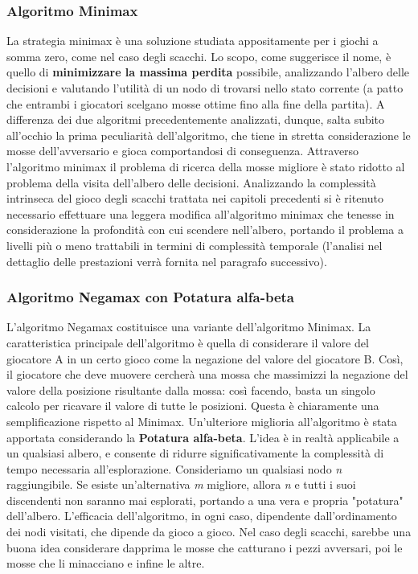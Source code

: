 \subsubsection{Algoritmo Minimax}
La strategia minimax è una soluzione studiata appositamente per i giochi a somma zero, come nel caso degli scacchi. Lo scopo, come suggerisce il nome, è quello di \textbf{minimizzare la massima perdita} possibile, analizzando l'albero delle decisioni e valutando l'utilità di un nodo di trovarsi nello stato corrente (a patto che entrambi i giocatori scelgano mosse ottime fino alla fine della partita). A differenza dei due algoritmi precedentemente analizzati, dunque, salta subito all'occhio la prima peculiarità dell'algoritmo, che tiene in stretta considerazione le mosse dell'avversario e gioca comportandosi di conseguenza. Attraverso l'algoritmo minimax il problema di ricerca della mosse migliore è stato ridotto al problema della visita dell'albero delle decisioni. Analizzando la complessità intrinseca del gioco degli scacchi trattata nei capitoli precedenti si è ritenuto necessario effettuare una leggera modifica all'algoritmo minimax che tenesse in considerazione la profondità con cui scendere nell'albero, portando il problema a livelli più o meno trattabili in termini di complessità temporale (l'analisi nel dettaglio delle prestazioni verrà fornita nel paragrafo successivo).
\subsubsection{Algoritmo Negamax con Potatura alfa-beta}
L'algoritmo Negamax costituisce una variante dell'algoritmo Minimax. La caratteristica principale dell'algoritmo è quella di considerare il valore del giocatore A in un certo gioco come la negazione del valore del giocatore B. Così, il giocatore che deve muovere cercherà una mossa che massimizzi la negazione del valore della posizione risultante dalla mossa: così facendo, basta un singolo calcolo per ricavare il valore di tutte le posizioni. Questa è chiaramente una semplificazione rispetto al Minimax. Un'ulteriore miglioria all'algoritmo è stata apportata considerando la \textbf{Potatura alfa-beta}. L'idea è in realtà applicabile a un qualsiasi albero, e consente di ridurre significativamente la complessità di tempo necessaria all'esplorazione. Consideriamo un qualsiasi nodo \textit{n} raggiungibile. Se esiste un'alternativa \textit{m} migliore, allora \textit{n} e tutti i suoi discendenti non saranno mai esplorati, portando a una vera e propria "potatura" dell'albero. L'efficacia dell'algoritmo, in ogni caso, dipendente dall'ordinamento dei nodi visitati, che dipende da gioco a gioco. Nel caso degli scacchi, sarebbe una buona idea considerare dapprima le mosse che catturano i pezzi avversari, poi le mosse che li minacciano e infine le altre. 

